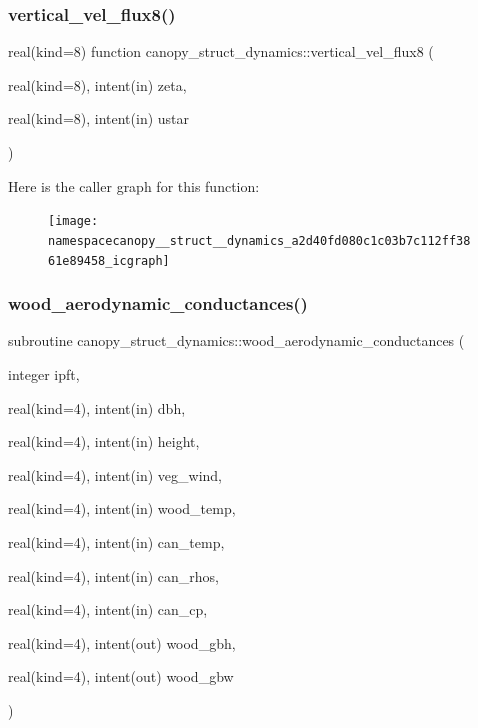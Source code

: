 \subsubsection{\texorpdfstring{vertical\+\_\+vel\+\_\+flux8()}{vertical\_vel\_flux8()}}
{\footnotesize\ttfamily real(kind=8) function canopy\+\_\+struct\+\_\+dynamics\+::vertical\+\_\+vel\+\_\+flux8 (\begin{DoxyParamCaption}\item[{real(kind=8), intent(in)}]{zeta,  }\item[{real(kind=8), intent(in)}]{ustar }\end{DoxyParamCaption})}

Here is the caller graph for this function\+:
\nopagebreak
\begin{figure}[H]
\begin{center}
\leavevmode
\texttt{[image: namespacecanopy\_\_struct\_\_dynamics\_a2d40fd080c1c03b7c112ff3861e89458\_icgraph]}
\end{center}
\end{figure}
\mbox{\label{namespacecanopy__struct__dynamics_ada33113f2dc56fb4576d2a52d2a573b0}} 
\subsubsection{\texorpdfstring{wood\+\_\+aerodynamic\+\_\+conductances()}{wood\_aerodynamic\_conductances()}}
{\footnotesize\ttfamily subroutine canopy\+\_\+struct\+\_\+dynamics\+::wood\+\_\+aerodynamic\+\_\+conductances (\begin{DoxyParamCaption}\item[{integer}]{ipft,  }\item[{real(kind=4), intent(in)}]{dbh,  }\item[{real(kind=4), intent(in)}]{height,  }\item[{real(kind=4), intent(in)}]{veg\+\_\+wind,  }\item[{real(kind=4), intent(in)}]{wood\+\_\+temp,  }\item[{real(kind=4), intent(in)}]{can\+\_\+temp,  }\item[{real(kind=4), intent(in)}]{can\+\_\+rhos,  }\item[{real(kind=4), intent(in)}]{can\+\_\+cp,  }\item[{real(kind=4), intent(out)}]{wood\+\_\+gbh,  }\item[{real(kind=4), intent(out)}]{wood\+\_\+gbw }\end{DoxyParamCaption})}

